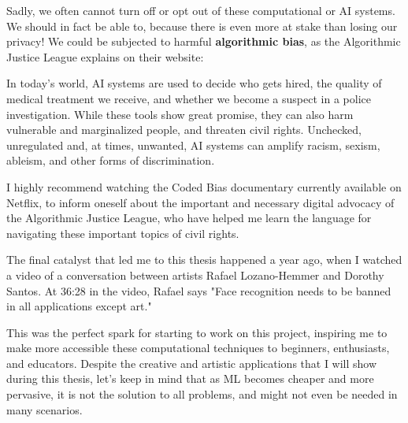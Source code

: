 Sadly, we often cannot turn off or opt out of these computational or \acrshort{AI} systems. We should in fact be able to, because there is even more at stake than losing our privacy! We could be subjected to harmful \textbf{algorithmic bias}, as the Algorithmic Justice League \cite{website-algorithmic-justice-league} explains on their website:

\begin{displayquote}
In today’s world, AI systems are used to decide who gets hired, the quality of medical treatment we receive, and whether we become a suspect in a police investigation. While these tools show great promise, they can also harm vulnerable and marginalized people, and threaten civil rights. Unchecked, unregulated and, at times, unwanted, AI systems can amplify racism, sexism, ableism, and other forms of discrimination.
\end{displayquote}

I highly recommend watching the Coded Bias documentary \cite{website-coded-bias} currently available on Netflix, to inform oneself about the important and necessary digital advocacy of the Algorithmic Justice League, who have helped me learn the language for navigating these important topics of civil rights.

The final catalyst that led me to this thesis happened a year ago, when I watched a video \cite{website-talk-technology-and-public-art-rafael-lozano-hemmer} of a conversation between artists Rafael Lozano-Hemmer and Dorothy Santos. At 36:28 in the video, Rafael says "Face recognition needs to be banned in all applications except art."

This was the perfect spark for starting to work on this project, inspiring me to make more accessible these computational techniques to beginners, enthusiasts, and educators. Despite the creative and artistic applications that I will show during this thesis, let's keep in mind that as \acrshort{ML} becomes cheaper and more pervasive, it is not the solution to all problems, and might not even be needed in many scenarios.

